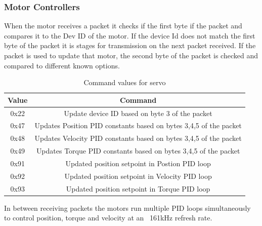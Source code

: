         \subsubsection{Motor Controllers}
            When the motor receives a packet it checks if the first byte if the packet and compares it to the Dev ID of the motor. If the device Id does not match the first byte of the packet it is stages for transmission on the next packet received. If the packet is used to update that motor, the second byte of the packet is checked and compared to different known options. 
            \begin{table}[H]
                \centering
                \begin{tabular}{|c|c|}
                \hline
                    Value & Command \\
                    \hline
                    0x22 & Update device ID based on byte 3 of the packet\\
                    0x47 & Updates Position PID constants based on bytes 3,4,5 of the packet \\
                    0x48 & Updates Velocity PID constants based on bytes 3,4,5 of the packet \\
                    0x49 & Updates Torque PID constants based on bytes 3,4,5 of the packet \\
                    0x91 & Updated position setpoint in Postion PID loop\\
                    0x92 & Updated position setpoint in Velocity PID loop\\
                    0x93 & Updated position setpoint in Torque PID loop\\
                    \hline
                    \end{tabular}
                \caption{Command values for servo}
                \label{tab:ServoCommandValues}
            \end{table}
            In between receiving packets the motors run multiple PID loops simultaneously to control position, torque and velocity at an ~161kHz refresh rate.
